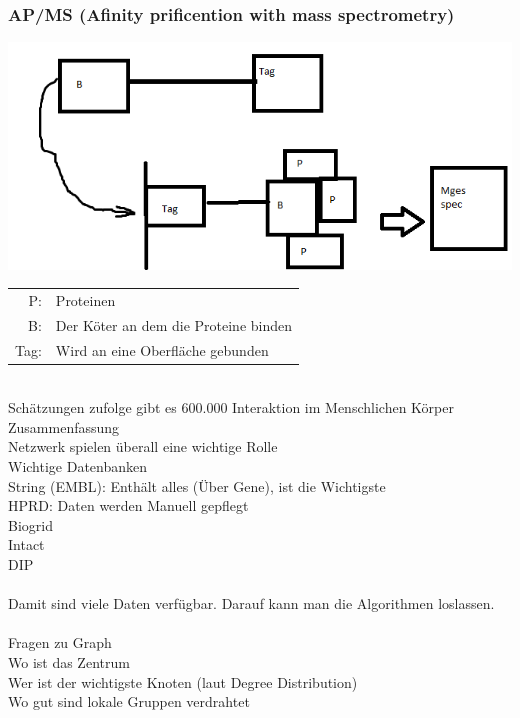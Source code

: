 \documentclass{article}
\begin{document}
\subsubsection{AP/MS (Afinity prificention with mass spectrometry)}
\includegraphics[scale=0.5]{APMS}\\
\begin{tabular}{r l}
P:   & Proteinen\\
B:   & Der Köter an dem die Proteine binden\\
Tag: & Wird an eine Oberfläche gebunden\\
\end{tabular}
\\

Schätzungen zufolge gibt es 600.000 Interaktion im Menschlichen Körper\\

Zusammenfassung\\
Netzwerk spielen überall eine wichtige Rolle\\

Wichtige Datenbanken\\
String (EMBL): Enthält alles (Über Gene), ist die Wichtigste\\
HPRD: Daten werden Manuell gepflegt\\
Biogrid\\
Intact\\
DIP\\
\\

Damit sind viele Daten verfügbar. Darauf kann man die Algorithmen loslassen.\\
\\

Fragen zu Graph\\
Wo ist das Zentrum\\
Wer ist der wichtigste Knoten (laut Degree Distribution)\\
Wo gut sind lokale Gruppen verdrahtet\\
\\
\end{document}

